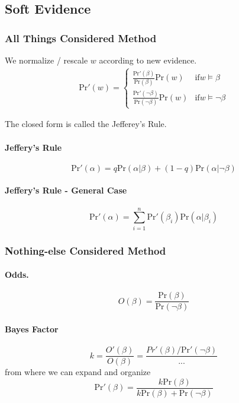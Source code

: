 \documentclass[11pt]{article}
\newcommand{\pr}{\mathrm{Pr}}
\begin{document}
\subsection{Soft Evidence}
\subsubsection{All Things Considered Method}
We normalize / rescale $w$ according to new evidence. 
\begin{align}
\pr' (w) = \begin{cases}
	\frac{\pr ' (\beta)}{\pr (\beta)} \pr ( w) &  \text{if} w \vDash \beta \\
	\frac{\pr' (\neg \beta)}{\pr (\neg \beta)} \pr (w) & \text{if} w \vDash \neg \beta
\end{cases}
\end{align}

The closed form is called the Jefferey's Rule. 

\paragraph{Jeffery's Rule}
\begin{equation}
	\pr ' (\alpha) = q \pr ( \alpha | \beta ) + (1 - q) \pr ( \alpha | \neg \beta)
\end{equation}

\paragraph{Jeffery's Rule - General Case}
\begin{equation}
	\pr'(\alpha) = \sum_{i = 1}^n\pr ' (\beta_i) \pr( \alpha | \beta_i) 
\end{equation}

\subsubsection{Nothing-else Considered Method}
\paragraph{Odds. } 
\begin{equation}
	O(\beta) = \frac{\pr( \beta)}{\pr ( \neg \beta)}
\end{equation}

\paragraph{Bayes Factor} 
\begin{equation}
	k = \frac{O'(\beta)}{O ( \beta)} = \frac{Pr'(\beta) / \pr'(\neg \beta)}{...}
\end{equation}
from where we can expand and organize
\begin{equation}
	\pr' ( \beta) = \frac{k \pr ( \beta) }{k \pr ( \beta) + \pr ( \neg \beta) } 
\end{equation}
\end{document}
